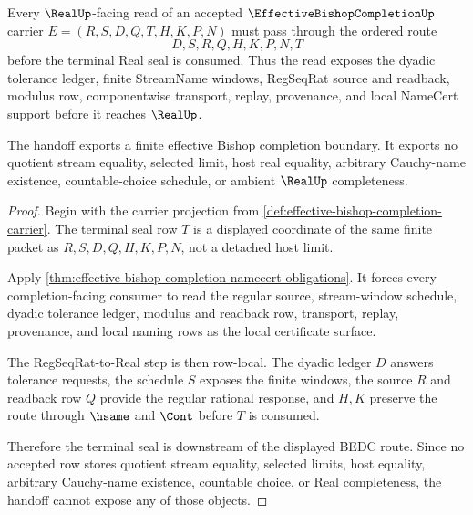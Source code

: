 \begin{theorem}
\label{thm:effective-bishop-completion-regseqrat-real-handoff}
Every $\RealUp$-facing read of an accepted $\EffectiveBishopCompletionUp$ carrier $E=(R,S,D,Q,T,H,K,P,N)$ must pass through the ordered route
$$
D,S,R,Q,H,K,P,N,T
$$
before the terminal Real seal is consumed. Thus the read exposes the dyadic tolerance ledger, finite StreamName windows, RegSeqRat source and readback, modulus row, componentwise transport, replay, provenance, and local NameCert support before it reaches $\RealUp$.

The handoff exports a finite effective Bishop completion boundary. It exports no quotient stream equality, selected limit, host real equality, arbitrary Cauchy-name existence, countable-choice schedule, or ambient $\RealUp$ completeness.
\end{theorem}
\begin{proof}
Begin with the carrier projection from \autoref{def:effective-bishop-completion-carrier}. The terminal seal row $T$ is a displayed coordinate of the same finite packet as $R,S,D,Q,H,K,P,N$, not a detached host limit.

Apply \autoref{thm:effective-bishop-completion-namecert-obligations}. It forces every completion-facing consumer to read the regular source, stream-window schedule, dyadic tolerance ledger, modulus and readback row, transport, replay, provenance, and local naming rows as the local certificate surface.

The RegSeqRat-to-Real step is then row-local. The dyadic ledger $D$ answers tolerance requests, the schedule $S$ exposes the finite windows, the source $R$ and readback row $Q$ provide the regular rational response, and $H,K$ preserve the route through $\hsame$ and $\Cont$ before $T$ is consumed.

Therefore the terminal seal is downstream of the displayed BEDC route. Since no accepted row stores quotient stream equality, selected limits, host equality, arbitrary Cauchy-name existence, countable choice, or Real completeness, the handoff cannot expose any of those objects.
\end{proof}


